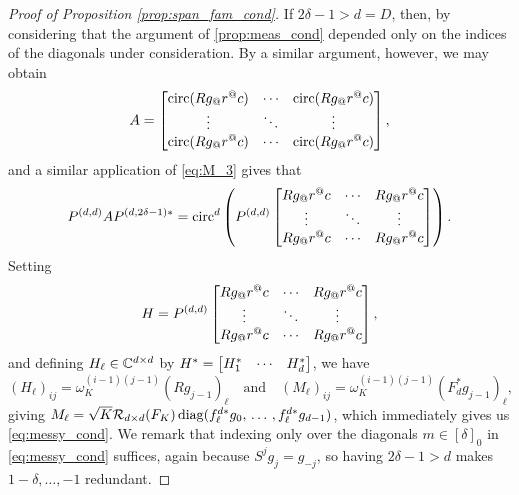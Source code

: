 \begin{proof}[Proof of Proposition \ref{prop:span_fam_cond}]
  If $2 \delta - 1 > d = D$, then, by considering that the argument of \cref{prop:meas_cond} depended only on the indices of the diagonals under consideration.  By a similar argument, however, we may obtain \[A = \cornmatfun{\circop(R g_@r^@c)}{0}{d - 1}{1}{d},\] and a similar application of \eqref{eq:M_3} gives that \[P^{(d, d)} A P^{(d, 2 \delta - 1)*} = \circop^d\left( P^{(d, d)} \cornmatfun{R g_@r^@c}{0}{d - 1}{1}{d} \right).\]  Setting \[H = P^{(d, d)} \cornmatfun{R g_@r^@c}{0}{d - 1}{1}{d},\] and defining $H_\ell \in \mathbb{C}^{d \times d}$ by $H^* = \begin{bmatrix} H^*_{1} & \cdots & H^*_{d} \end{bmatrix}$, %
  we have \[(H_\ell)_{ij} = \omega_K^{(i - 1)(j - 1)} (R g_{j - 1})_\ell \quad \text{and} \quad (M_\ell)_{ij} = \omega_K^{(i - 1)(j - 1)} (F_d^* g_{j - 1})_\ell,\] giving $M_\ell = \sqrt{K} \mathcal{R}_{d \times d}(F_K) \operatorname{diag}(f_\ell^{d*} g_0,\, \ldots\, , f_\ell^{d*} g_{d - 1})$, which immediately gives us \eqref{eq:messy_cond}.  We remark that indexing only over the diagonals $m \in [\delta]_0$ in \eqref{eq:messy_cond} suffices, again because $S^j g_j = g_{-j}$, so having $2 \delta - 1 > d$ makes $1 - \delta, \ldots, -1$ redundant.
  
\end{proof}
